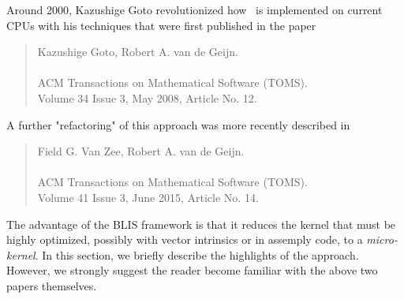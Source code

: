 Around 2000, Kazushige Goto revolutionized how \Gemm\ is implemented on current CPUs with his techniques
that were first published in the paper~\cite{Goto:2008:AHP}
\begin{quote}
	Kazushige Goto, Robert A. van de Geijn.\\
	\\
	ACM Transactions on Mathematical Software (TOMS).\\
	Volume 34 Issue 3, May 2008, Article No. 12.\\
\end{quote}
A further "refactoring" of this approach was more recently described in~\cite{BLIS1} 
\begin{quote}
	Field G. Van Zee, Robert A. van de Geijn. \\
	 \\
	ACM Transactions on Mathematical Software (TOMS).\\
	Volume 41 Issue 3, June 2015,
	Article No. 14. \\
\end{quote}
The advantage of the BLIS framework is that it reduces the kernel that must be highly optimized, possibly with vector intrinsics or in assemply code, to a {\em micro-kernel}.   In this section, we briefly describe the highlights of the approach.  However, we strongly suggest the reader become familiar with the above two papers themselves.

